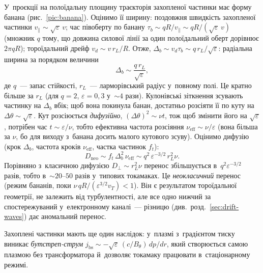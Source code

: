 У~проєкції на полоїдальну площину траєкторія захопленої частинки має форму банана
(рис.~\ref{pic:banana}). Оцінимо її ширину: поздовжня швидкість захопленої частинки $v_\parallel\sim\sqrt\varepsilon\,v$;
час півоберту по банану $\tau_b\sim qR/v_\parallel\sim qR/(\sqrt\varepsilon\,v)$ (множник $q$ тому, що довжина силової лінії за один
полоїдальний оберт дорівнює $2\pi qR$); тороїдальний дрейф $v_d\sim v\,r_L/R$. Отже, $\Delta_b\sim v_d\tau_b\sim q\,r_L/\sqrt\varepsilon$:
радіальна ширина за порядком величини
\begin{equation}\label{eq:banana-width}
	\Delta_b\sim\frac{q\,r_L}{\sqrt\varepsilon},
\end{equation}
де $q$~--- запас стійкості, $r_L$~--- ларморівський радіус у~повному полі. Це кратно
більше за $r_L$ (для $q=2$, $\varepsilon=0{,}3$ у~$\sim4$ рази). Кулонівські
зіткнення зсувають частинку на $\Delta_b$ вбік; щоб вона покинула банан, достатньо розсіяти її по
куту на $\Delta\theta\sim\sqrt\varepsilon$. Кут розсіюється \emph{дифузійно}, $(\Delta\theta)^2\sim\nu t$, тож щоб змінити його
на $\sqrt\varepsilon$, потрібен час $t\sim\varepsilon/\nu$, тобто ефективна частота розсіяння $\nu_\mathrm{eff}\sim\nu/\varepsilon$
(вона більша за $\nu$, бо для виходу з~банана досить малого кутового зсуву).
Оцінимо дифузію (крок $\Delta_b$, частота кроків $\nu_\mathrm{eff}$, частка частинок $f_t$):
\begin{equation}\label{eq:neoclassical}
	D_\mathrm{neo}\sim f_t\,\Delta_b^2\,\nu_\mathrm{eff}\sim q^2\,\varepsilon^{-3/2}\,r_L^2\nu.
\end{equation}
Порівняно з~класичною дифузією $D_\perp\sim r_L^2\nu$ перенос збільшується в~$q^2\varepsilon^{-3/2}$
разів, тобто в~$\sim20$--$50$ разів у~типових токамаках. Це \emph{неокласичний} перенос
(режим бананів, поки $\nu\,qR/(\varepsilon^{3/2}v_T)<1$). Він є результатом тороїдальної геометрії,
не залежить від турбулентності, але все одно нижчий за спостережуваний у~електронному каналі~---
різницю (див.~розд.~\ref{sec:drift-waves}) дає аномальний перенос.

Захоплені частинки мають ще один наслідок: у~плазмі з~градієнтом тиску виникає
\emph{бутстреп-струм} $j_\mathrm{bs}\sim-\sqrt\varepsilon\,(c/B_\theta)\,dp/dr$, який створюється самою плазмою
без трансформатора й~дозволяє токамаку працювати в~стаціонарному режимі.

